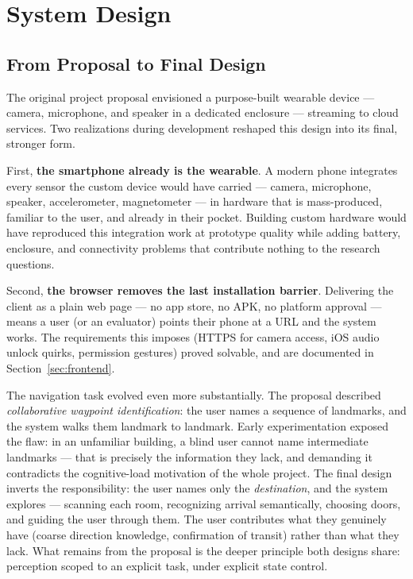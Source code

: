 \chapter{System Design}
\label{ch:system_design}

\section{From Proposal to Final Design}
\label{sec:design_evolution}

The original project proposal envisioned a purpose-built wearable device --- camera,
microphone, and speaker in a dedicated enclosure --- streaming to cloud services. Two
realizations during development reshaped this design into its final, stronger form.

First, \textbf{the smartphone already is the wearable}. A modern phone integrates
every sensor the custom device would have carried --- camera, microphone, speaker,
accelerometer, magnetometer --- in hardware that is mass-produced, familiar to the
user, and already in their pocket. Building custom hardware would have reproduced
this integration work at prototype quality while adding battery, enclosure, and
connectivity problems that contribute nothing to the research questions.

Second, \textbf{the browser removes the last installation barrier}. Delivering the
client as a plain web page --- no app store, no APK, no platform approval --- means a
user (or an evaluator) points their phone at a URL and the system works. The
requirements this imposes (HTTPS for camera access, iOS audio unlock quirks,
permission gestures) proved solvable, and are documented in
Section~\ref{sec:frontend}.

The navigation task evolved even more substantially. The proposal described
\emph{collaborative waypoint identification}: the user names a sequence of landmarks,
and the system walks them landmark to landmark. Early experimentation exposed the
flaw: in an unfamiliar building, a blind user cannot name intermediate landmarks ---
that is precisely the information they lack, and demanding it contradicts the
cognitive-load motivation of the whole project. The final design inverts the
responsibility: the user names only the \emph{destination}, and the system explores
--- scanning each room, recognizing arrival semantically, choosing doors, and
guiding the user through them. The user contributes what they genuinely have (coarse
direction knowledge, confirmation of transit) rather than what they lack. What
remains from the proposal is the deeper principle both designs share: perception
scoped to an explicit task, under explicit state control.

